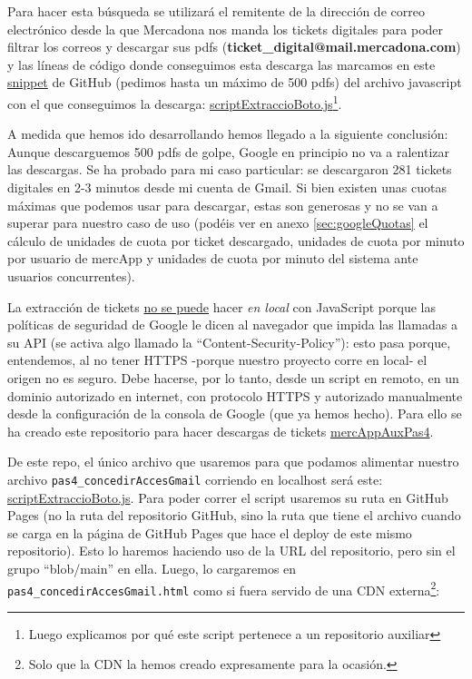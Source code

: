 \documentclass[a4paper,12pt]{report}
\begin{document}
	
	Para hacer esta búsqueda se utilizará el remitente de la dirección  de correo electrónico desde la que  Mercadona nos manda los tickets digitales para poder filtrar los correos y descargar sus  pdfs (\textbf{ticket\_digital@mail.mercadona.com}) y las líneas de código donde conseguimos esta descarga las marcamos en este  \href{https://github.com/blackcub3s/mercAppAuxPas4/blob/e899ea50757bf3367c523f5a21d59f79bdb381ad/js/scriptExtraccioBoto.js#L89-L93}{snippet} de GitHub (pedimos hasta un máximo de 500 pdfs) del archivo javascript con el que conseguimos la descarga: \href{https://github.com/blackcub3s/mercAppAuxPas4/blob/main/js/scriptExtraccioBoto.js}{scriptExtraccioBoto.js}\footnote{Luego explicamos por qué este script pertenece a un repositorio auxiliar}.
	
	A medida que hemos ido desarrollando hemos llegado a la siguiente conclusión: Aunque descarguemos 500  pdfs de golpe, Google en principio no va a ralentizar las descargas. Se ha probado para mi caso particular: se descargaron 281 tickets digitales en 2-3 minutos desde mi cuenta de Gmail. Si bien existen unas cuotas máximas que podemos usar para descargar, estas son generosas y no se van a superar para nuestro caso de uso (podéis ver en anexo \ref{sec:googleQuotas} el cálculo de unidades de cuota por ticket descargado, unidades de cuota por minuto por usuario de mercApp y unidades de cuota por minuto del sistema ante usuarios concurrentes). 
	
	
	La extracción de tickets \underline{no se puede} hacer \textit{en local} con JavaScript porque las políticas de seguridad de Google le dicen al navegador que impida las llamadas a su API (se activa algo llamado la ``Content-Security-Policy''): esto pasa porque, entendemos, al no tener HTTPS -porque nuestro proyecto corre en local- el origen no es seguro. Debe hacerse, por lo tanto, desde un script en remoto, en un dominio autorizado en internet, con protocolo HTTPS y autorizado manualmente desde la configuración de la consola de Google (que ya hemos hecho). Para ello se ha creado este repositorio para hacer descargas de tickets \href{https://github.com/blackcub3s/mercAppAuxPas4/}{mercAppAuxPas4}.
	
	De este repo, el único archivo que usaremos para que podamos alimentar nuestro archivo \texttt{pas4\_concedirAccesGmail} corriendo en localhost será este: \href{https://github.com/blackcub3s/mercAppAuxPas4/blob/main/js/scriptExtraccioBoto.js}{scriptExtraccioBoto.js}. Para poder correr el script usaremos su ruta en GitHub Pages (no la ruta del repositorio GitHub, sino la ruta que tiene el archivo cuando se carga en la página de GitHub Pages que hace el deploy de este mismo repositorio). Esto lo haremos haciendo uso de la URL del repositorio, pero sin el grupo ``blob/main'' en ella. Luego, lo cargaremos en \texttt{pas4\_concedirAccesGmail.html} como si fuera servido de una CDN externa\footnote{Solo que la CDN la hemos creado expresamente para la ocasión.}:
	
\end{document}
